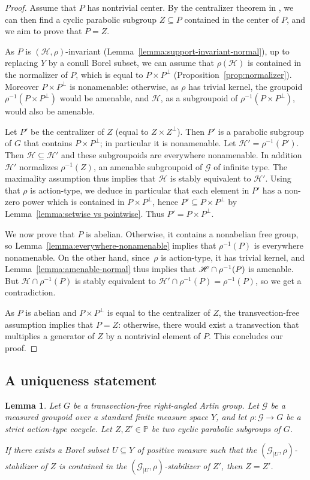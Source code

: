 \documentclass[11pt]{article}
\newcommand{\Subsection}{\subsection}
\numberwithin{equation}{section}
\let\mathcal\mathscr
\theoremstyle{plain}
\newtheorem{lemma}[theo]{Lemma}
\theoremstyle{definition}
\newcommand{\calg}{\mathcal{G}}
\newcommand{\calh}{\mathcal{H}}
\begin{document}
\begin{proof}
Assume that $P$ has nontrivial center. By the centralizer theorem in \cite{Ser}, we can then find a cyclic parabolic subgroup $Z\subseteq P$ contained in the center of $P$, and we aim to prove that $P=Z$.

As $P$ is $(\calh,\rho)$-invariant (Lemma~\ref{lemma:support-invariant-normal}), up to replacing $Y$ by a conull Borel subset, we can assume that $\rho(\calh)$ is contained in the normalizer of $P$, which is equal to $P\times P^{\perp}$ (Proposition~\ref{prop:normalizer}). Moreover $P\times P^{\perp}$ is nonamenable: otherwise, as $\rho$ has trivial kernel, the groupoid $\rho^{-1}(P\times P^{\perp})$ would be amenable, and $\calh$, as a subgroupoid of $\rho^{-1}(P\times P^{\perp})$, would also be amenable.

Let $P'$ be the centralizer of $Z$ (equal to $Z\times Z^{\perp}$). Then $P'$ is a parabolic subgroup of $G$ that contains $P\times P^\perp$; in particular it is nonamenable. Let $\calh'=\rho^{-1}(P')$. Then $\calh\subseteq\calh'$ and these subgroupoids are everywhere nonamenable. In addition $\calh'$ normalizes $\rho^{-1}(Z)$, an amenable subgroupoid of $\calg$ of infinite type. The maximality assumption thus implies that $\calh$ is stably equivalent to $\calh'$. Using that $\rho$ is action-type, we deduce in particular that each element in $P'$ has a non-zero power which is contained in $P\times P^\perp$, hence $P'\subseteq P\times P^{\perp}$ by Lemma~\ref{lemma:setwise vs pointwise}. Thus $P'=P\times P^\perp$.

We now prove that $P$ is abelian. Otherwise, it contains a nonabelian free group, so Lemma~\ref{lemma:everywhere-nonamenable} implies that $\rho^{-1}(P)$ is everywhere nonamenable. On the other hand, since~$\rho$ is action-type, it has trivial kernel, and Lemma~\ref{lemma:amenable-normal} thus implies that $\calh\cap\nobreak \rho^{-1}(P)$ is amenable. But $\calh\cap\rho^{-1}(P)$ is stably equivalent to $\calh'\cap\rho^{-1}(P)=\rho^{-1}(P)$, so we get a contradiction.

As $P$ is abelian and $P\times P^{\perp}$ is equal to the centralizer of $Z$, the transvection-free assumption implies that $P=Z$: otherwise, there would exist a transvection that multiplies a generator of $Z$ by a nontrivial element of $P$. This concludes our proof.
\end{proof}

\Subsection{A uniqueness statement}

\begin{lemma}\label{lemma:uniqueness}
Let $G$ be a transvection-free right-angled Artin group. Let $\calg$ be a measured groupoid over a standard finite measure space $Y$, and let $\rho:\calg\to G$ be a strict action-type cocycle. Let $Z,Z'\in\mathbb{P}$ be two cyclic parabolic subgroups of $G$.

If there exists a Borel subset $U\subseteq Y$ of positive measure such that the $(\calg_{|U},\rho)$-stabilizer of $Z$ is contained in the $(\calg_{|U},\rho)$-stabilizer of $Z'$, then $Z=Z'$.
\end{lemma}
\end{document}
